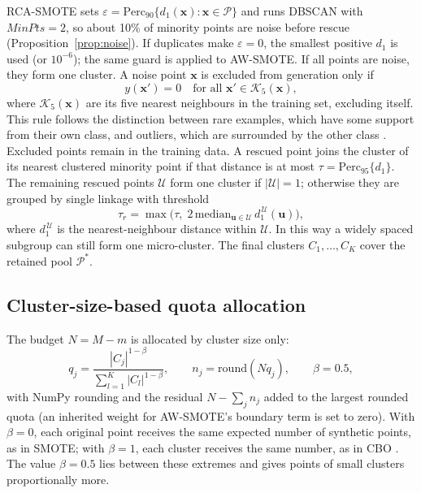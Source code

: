 \documentclass[preprint,nopreprintline]{elsarticle}
\theoremstyle{plain}
\theoremstyle{definition}
\begin{document}
RCA-SMOTE sets $\varepsilon=\mathrm{Perc}_{90}\{d_1(\mathbf{x}):\mathbf{x}\in\mathcal{P}\}$ and runs DBSCAN with $\textit{MinPts}=2$, so about 10\% of minority points are noise before rescue (Proposition~\ref{prop:noise}). If duplicates make $\varepsilon=0$, the smallest positive $d_1$ is used (or $10^{-6}$); the same guard is applied to AW-SMOTE. If all points are noise, they form one cluster. A noise point $\mathbf{x}$ is excluded from generation only if
\begin{equation}\label{eq:rescue}
y(\mathbf{x}')=0\quad\text{for all }\mathbf{x}'\in\mathcal{K}_5(\mathbf{x}),
\end{equation}
where $\mathcal{K}_5(\mathbf{x})$ are its five nearest neighbours in the training set, excluding itself. This rule follows the distinction between rare examples, which have some support from their own class, and outliers, which are surrounded by the other class \cite{napierala2016types}. Excluded points remain in the training data. A rescued point joins the cluster of its nearest clustered minority point if that distance is at most $\tau=\mathrm{Perc}_{95}\{d_1\}$. The remaining rescued points $\mathcal{U}$ form one cluster if $|\mathcal{U}|=1$; otherwise they are grouped by single linkage with threshold
\begin{equation}\label{eq:taur}
\tau_r=\max\bigl(\tau,\;2\,\mathrm{median}_{\mathbf{u}\in\mathcal{U}}\,d_1^{\,\mathcal{U}}(\mathbf{u})\bigr),
\end{equation}
where $d_1^{\,\mathcal{U}}$ is the nearest-neighbour distance within $\mathcal{U}$. In this way a widely spaced subgroup can still form one micro-cluster. The final clusters $C_1,\dots,C_K$ cover the retained pool $\mathcal{P}^{*}$.

\subsection{Cluster-size-based quota allocation}\label{sec:quota}

The budget $N=M-m$ is allocated by cluster size only:
\begin{equation}\label{eq:quota}
q_j=\frac{|C_j|^{1-\beta}}{\sum_{l=1}^{K}|C_l|^{1-\beta}},\qquad n_j=\mathrm{round}(Nq_j),\qquad \beta=0.5,
\end{equation}
with NumPy rounding and the residual $N-\sum_jn_j$ added to the largest rounded quota (an inherited weight for AW-SMOTE's boundary term is set to zero). With $\beta=0$, each original point receives the same expected number of synthetic points, as in SMOTE; with $\beta=1$, each cluster receives the same number, as in CBO \cite{jo2004class}. The value $\beta=0.5$ lies between these extremes and gives points of small clusters proportionally more.
\end{document}
